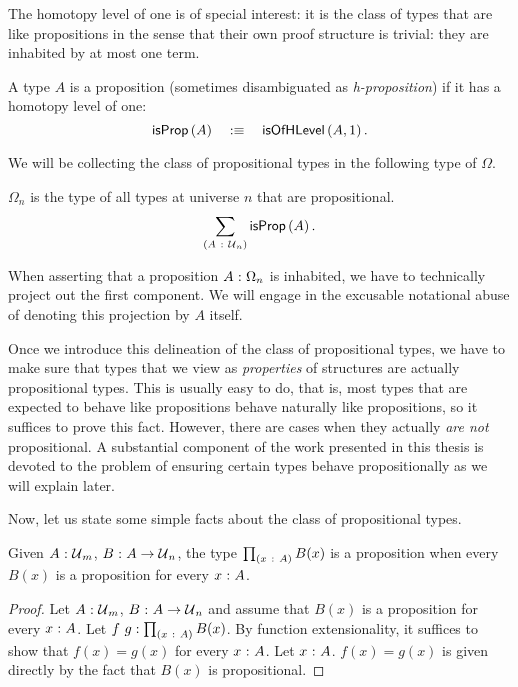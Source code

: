 The homotopy level of one is of special interest: it is the class of types that are like
propositions in the sense that their own proof structure is trivial: they are inhabited by
at most one term.

\begin{defn}[Proposition]
  A type $A$ is a proposition (sometimes disambiguated as \emph{h-proposition}) if it has
  a homotopy level of one:
  \begin{equation*}
    \mathsf{isProp}\left(A\right) \quad:\equiv\quad \mathsf{isOfHLevel}\left(A, 1\right).
  \end{equation*}
\end{defn}

We will be collecting the class of propositional types in the following type of $\Omega$.

\begin{defn}[$\Omega$]
  $\Omega_n$ is the type of all types at universe $n$ that are propositional.
  \begin{equation*}
    \sum_{(A~:~\mathcal{U}{}_n)} \mathsf{isProp}\left(A\right).
  \end{equation*}
\end{defn}

When asserting that a proposition $A\hspace{0.1mm}:\hspace{0.1mm}\Omega_n$ is inhabited, we have to technically
project out the first component. We will engage in the excusable notational abuse of
denoting this projection by $A$ itself.

Once we introduce this delineation of the class of propositional types, we have to make
sure that types that we view as \emph{properties} of structures are actually propositional
types. This is usually easy to do, that is, most types that are expected to behave like
propositions behave naturally like propositions, so it suffices to prove this fact.
However, there are cases when they actually \emph{are not} propositional. A substantial
component of the work presented in this thesis is devoted to the problem of ensuring
certain types behave propositionally as we will explain later.

Now, let us state some simple facts about the class of propositional types.

\begin{prop}\label{thm:pi-prop}
  Given $A\hspace{0.1mm}:\hspace{0.1mm}\mathcal{U}{}_m$, $B\hspace{0.1mm}:\hspace{0.1mm}A \rightarrow \mathcal{U}{}_n$, the type $\prod_{(x~:~A)} B(x)$
  is a proposition when every $B(x)$ is a proposition for every $x\hspace{0.1mm}:\hspace{0.1mm}A$.
\end{prop}
\begin{proof}
  Let $A\hspace{0.1mm}:\hspace{0.1mm}\mathcal{U}{}_m$, $B\hspace{0.1mm}:\hspace{0.1mm}A \rightarrow \mathcal{U}{}_n$ and assume that $B(x)$ is a
  proposition for every $x\hspace{0.1mm}:\hspace{0.1mm}A$. Let $f~g:\prod_{(x~:~A)} B(x)$. By
  function extensionality, it suffices to show that $f(x) = g(x)$ for every
  $x\hspace{0.1mm}:\hspace{0.1mm}A$. Let $x\hspace{0.1mm}:\hspace{0.1mm}A$. $f(x) = g(x)$ is given directly by the fact that
  $B(x)$ is propositional.
\end{proof}

